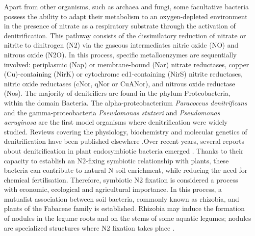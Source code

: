 \documentclass[12pt]{article}
\begin{document}
Apart from other organisms, such as archaea and fungi, some facultative bacteria
possess the ability to adapt their metabolism to an oxygen-depleted environment in the
presence of nitrate as a respiratory substrate through the activation of denitrification. This
pathway consists of the dissimilatory reduction of nitrate or nitrite to
dinitrogen (N2) via the gaseous intermediates nitric oxide (NO) and nitrous oxide (N2O).
In this process, specific metalloenzymes are sequentially involved: periplasmic (Nap) or
membrane-bound (Nar) nitrate reductases, copper (Cu)-containing (NirK) or cytochrome
cd1-containing (NirS) nitrite reductases, nitric oxide reductases (cNor, qNor or CuANor),
and nitrous oxide reductase (Nos). The majority of denitrifiers are found in the phylum
Proteobacteria, within the domain Bacteria. The alpha-proteobacterium {\em Paracoccus denitrificans}
and the 
gamma-proteobacteria {\em Pseudomonas stutzeri} and {\em Pseudomonas aeruginosa} are the
first model organisms where denitrification were widely studied. Reviews covering the
physiology, biochemistry and molecular genetics of denitrification have been published
elsewhere \cite{zumft1997cell}\cite{vannitrogen}\cite{van2007introduction}\cite{kraft2011microbial}\cite{bueno2012bacterial}\cite{torres2016nitrous}.Over recent years, several reports about denitrification in plant endosymbiotic
bacteria emerged \cite{bedmar2005complete}\cite{bedmar2013ecology}\cite{salas2021bacterial}. Thanks to their capacity to establish an N2-fixing symbiotic
relationship with plants, these bacteria can contribute to natural N soil enrichment, while
reducing the need for chemical fertilisation. Therefore, symbiotic N2 fixation is considered a
process with economic, ecological and agricultural importance. In this process, a mutualist
association between soil bacteria, commonly known as rhizobia, and plants of the Fabaceae
family is established. Rhizobia may induce the formation of nodules in the legume roots
and on the stems of some aquatic legumes; nodules are specialized structures where N2
fixation takes place \cite{poole2018rhizobia}.
\end{document}
